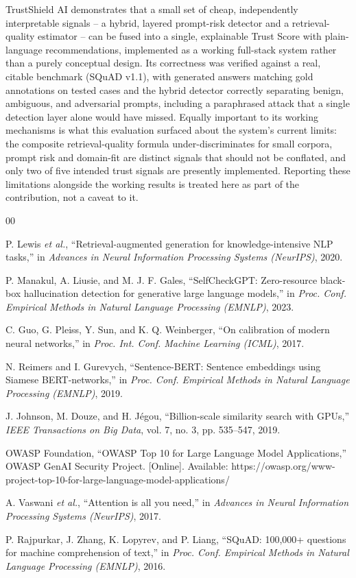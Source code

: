 \documentclass[conference]{IEEEtran}
\begin{document}
TrustShield AI demonstrates that a small set of cheap, independently interpretable
signals -- a hybrid, layered prompt-risk detector and a retrieval-quality estimator --
can be fused into a single, explainable Trust Score with plain-language recommendations,
implemented as a working full-stack system rather than a purely conceptual design. Its
correctness was verified against a real, citable benchmark (SQuAD v1.1), with generated
answers matching gold annotations on tested cases and the hybrid detector correctly
separating benign, ambiguous, and adversarial prompts, including a paraphrased attack
that a single detection layer alone would have missed. Equally important to its working
mechanisms is what this evaluation surfaced about the system's current limits: the
composite retrieval-quality formula under-discriminates for small corpora, prompt risk
and domain-fit are distinct signals that should not be conflated, and only two of five
intended trust signals are presently implemented. Reporting these limitations alongside
the working results is treated here as part of the contribution, not a caveat to it.

\begin{thebibliography}{00}

P. Lewis \emph{et al.}, ``Retrieval-augmented generation for knowledge-intensive NLP
tasks,'' in \emph{Advances in Neural Information Processing Systems (NeurIPS)}, 2020.

P. Manakul, A. Liusie, and M. J. F. Gales, ``SelfCheckGPT: Zero-resource black-box
hallucination detection for generative large language models,'' in \emph{Proc. Conf.
Empirical Methods in Natural Language Processing (EMNLP)}, 2023.

C. Guo, G. Pleiss, Y. Sun, and K. Q. Weinberger, ``On calibration of modern neural
networks,'' in \emph{Proc. Int. Conf. Machine Learning (ICML)}, 2017.

N. Reimers and I. Gurevych, ``Sentence-BERT: Sentence embeddings using Siamese
BERT-networks,'' in \emph{Proc. Conf. Empirical Methods in Natural Language Processing
(EMNLP)}, 2019.

J. Johnson, M. Douze, and H. Jégou, ``Billion-scale similarity search with GPUs,''
\emph{IEEE Transactions on Big Data}, vol. 7, no. 3, pp. 535--547, 2019.

OWASP Foundation, ``OWASP Top 10 for Large Language Model Applications,'' OWASP GenAI
Security Project. [Online]. Available: https://owasp.org/www-project-top-10-for-large-language-model-applications/

A. Vaswani \emph{et al.}, ``Attention is all you need,'' in \emph{Advances in Neural
Information Processing Systems (NeurIPS)}, 2017.

P. Rajpurkar, J. Zhang, K. Lopyrev, and P. Liang, ``SQuAD: 100,000+ questions for
machine comprehension of text,'' in \emph{Proc. Conf. Empirical Methods in Natural
Language Processing (EMNLP)}, 2016.

\end{thebibliography}
\end{document}
